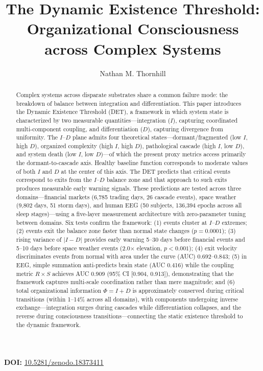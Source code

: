 \documentclass[12pt,a4paper]{article}
\title{The Dynamic Existence Threshold: Organizational Consciousness across Complex Systems}
\author{Nathan M. Thornhill}
\affil{Independent Researcher\\
Fort Wayne, Indiana, USA\\
\textrm{research@nathanthornhill.com} $|$ \textrm{https://nathanthornhill.com}}
\date{}
\newcommand{\zenododoi}{10.5281/zenodo.18373411}
\begin{document}
\maketitle

\noindent\textbf{DOI:} \href{https://doi.org/\zenododoi}{\zenododoi}
\bigskip

\begin{abstract}
Complex systems across disparate substrates share a common failure mode: the breakdown of balance between integration and differentiation. This paper introduces the Dynamic Existence Threshold (DET), a framework in which system state is characterized by two measurable quantities---integration ($I$), capturing coordinated multi-component coupling, and differentiation ($D$), capturing divergence from uniformity. The $I$--$D$ plane admits four theoretical states---dormant/fragmented (low $I$, high $D$), organized complexity (high $I$, high $D$), pathological cascade (high $I$, low $D$), and system death (low $I$, low $D$)---of which the present proxy metrics access primarily the dormant-to-cascade axis. Healthy baseline function corresponds to moderate values of both $I$ and $D$ at the center of this axis. The DET predicts that critical events correspond to exits from the $I$--$D$ balance zone and that approach to such exits produces measurable early warning signals. These predictions are tested across three domains---financial markets (6,785 trading days, 26 cascade events), space weather (9,802 days, 51 storm days), and human EEG (50 subjects, 136,394 epochs across all sleep stages)---using a five-layer measurement architecture with zero-parameter tuning between domains. Six tests confirm the framework: (1) events cluster at $I$--$D$ extremes; (2) events exit the balance zone faster than normal state changes ($p = 0.0001$); (3) rising variance of $|I - D|$ provides early warning 5--30 days before financial events and 5--10 days before space weather events (2.0$\times$ elevation, $p < 0.001$); (4) exit velocity discriminates events from normal with area under the curve (AUC) 0.692--0.843; (5) in EEG, simple summation anti-predicts brain state (AUC 0.416) while the coupling metric $R \times S$ achieves AUC 0.909 (95\% CI [0.904, 0.913]), demonstrating that the framework captures multi-scale coordination rather than mere magnitude; and (6) total organizational information $\Phi = I + D$ is approximately conserved during critical transitions (within 1--14\% across all domains), with components undergoing inverse exchange---integration surges during cascades while differentiation collapses, and the reverse during consciousness transitions---connecting the static existence threshold to the dynamic framework.
\end{abstract}
\end{document}
